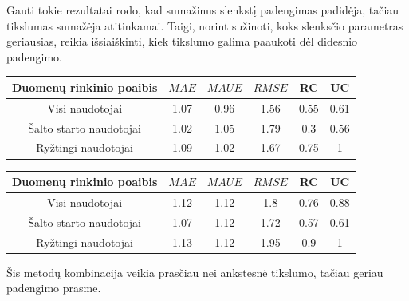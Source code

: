 \documentclass{VUMIFInfMagistrinis}
\begin{document}
 Gauti tokie rezultatai rodo, kad sumažinus slenkstį padengimas padidėja, tačiau tikslumas sumažėja atitinkamai. Taigi, norint sužinoti, koks slenksčio parametras geriausias, reikia išsiaiškinti, kiek tikslumo galima paaukoti dėl didesnio padengimo.
\begin{center}
	\begin{tabular}{||c c c c c c||} 
		Duomenų rinkinio poaibis & $MAE$ & $MAUE$ & $RMSE$ & RC & UC \\
		\hline
		Visi naudotojai & 1.07 & 0.96 & 1.56 & 0.55 & 0.61 \\
		\hline
		Šalto starto naudotojai & 1.02 & 1.05 & 1.79 & 0.3 & 0.56 \\
		\hline
		Ryžtingi naudotojai & 1.09 & 1.02 & 1.67 & 0.75 & 1 \\
	\end{tabular}
\end{center}
\begin{center}
	\begin{tabular}{||c c c c c c||} 
		Duomenų rinkinio poaibis & $MAE$ & $MAUE$ & $RMSE$ & RC & UC \\
		\hline
		Visi naudotojai & 1.12 & 1.12 & 1.8 & 0.76 & 0.88 \\
		\hline
		Šalto starto naudotojai & 1.07 & 1.12 & 1.72 & 0.57 & 0.61 \\
		\hline
		Ryžtingi naudotojai & 1.13 & 1.12 & 1.95 & 0.9 & 1 \\
	\end{tabular}
\end{center}
\indent
Šis metodų kombinacija veikia prasčiau nei ankstesnė tikslumo, tačiau geriau padengimo prasme.
\end{document}
